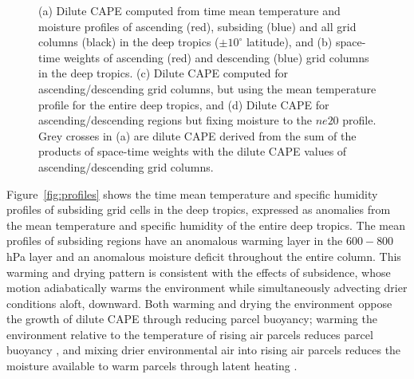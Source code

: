 \documentclass[times]{qjrms4}
\begin{document}
\begin{figure}
\begin{center}
\end{center}
\caption{(a) Dilute CAPE computed from time mean temperature and moisture profiles of ascending (red), subsiding (blue) and all grid columns (black) in the deep tropics ($\pm 10^{\circ}$ latitude), and (b) space-time weights of ascending (red) and descending (blue) grid columns in the deep tropics. (c) Dilute CAPE computed for ascending/descending grid columns, but using the mean temperature profile for the entire deep tropics, and (d) Dilute CAPE for ascending/descending regions but fixing moisture to the $ne20$ profile. Grey crosses in (a) are dilute CAPE derived from the sum of the products of space-time weights with the dilute CAPE values of ascending/descending grid columns.}
\label{fig:cape}
\end{figure}

Figure~\ref{fig:profiles} shows the time mean temperature and specific humidity profiles of subsiding grid cells in the deep tropics, expressed as anomalies from the mean temperature and specific humidity of the entire deep tropics. The mean profiles of subsiding regions have an anomalous warming layer in the $600-800$ hPa layer and an anomalous moisture deficit throughout the entire column. This warming and drying pattern is consistent with the effects of subsidence, whose motion adiabatically warms the environment while simultaneously advecting drier conditions aloft, downward. Both warming and drying the environment oppose the growth of dilute CAPE through reducing parcel buoyancy; warming the environment relative to the temperature of rising air parcels reduces parcel buoyancy \citep{Z2002JGR}, and mixing drier environmental air into rising air parcels reduces the moisture available to warm parcels through latent heating \citep{RB1992JAS}.
\end{document}
